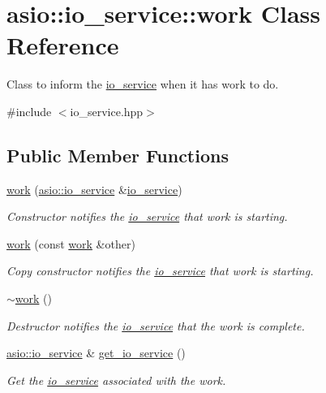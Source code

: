 \hypertarget{classasio_1_1io__service_1_1work}{}\section{asio\+:\+:io\+\_\+service\+:\+:work Class Reference}
\label{classasio_1_1io__service_1_1work}


Class to inform the \hyperlink{classasio_1_1io__service}{io\+\_\+service} when it has work to do.  




{\ttfamily \#include $<$io\+\_\+service.\+hpp$>$}

\subsection*{Public Member Functions}
\begin{DoxyCompactItemize}
\item 
\hyperlink{classasio_1_1io__service_1_1work_a6f49aeea63cbba270f16f71229958b6b}{work} (\hyperlink{classasio_1_1io__service}{asio\+::io\+\_\+service} \&\hyperlink{classasio_1_1io__service}{io\+\_\+service})
\begin{DoxyCompactList}\small\item\em Constructor notifies the \hyperlink{classasio_1_1io__service}{io\+\_\+service} that work is starting. \end{DoxyCompactList}\item 
\hyperlink{classasio_1_1io__service_1_1work_aa2e88368613626e0bbfa8df0fa002bb2}{work} (const \hyperlink{classasio_1_1io__service_1_1work}{work} \&other)
\begin{DoxyCompactList}\small\item\em Copy constructor notifies the \hyperlink{classasio_1_1io__service}{io\+\_\+service} that work is starting. \end{DoxyCompactList}\item 
\hyperlink{classasio_1_1io__service_1_1work_aa2f10ca46883519c66c50973ffabbe49}{$\sim$work} ()
\begin{DoxyCompactList}\small\item\em Destructor notifies the \hyperlink{classasio_1_1io__service}{io\+\_\+service} that the work is complete. \end{DoxyCompactList}\item 
\hyperlink{classasio_1_1io__service}{asio\+::io\+\_\+service} \& \hyperlink{classasio_1_1io__service_1_1work_a2f8c17cdaa95e5bf43002d37b1d6eb90}{get\+\_\+io\+\_\+service} ()
\begin{DoxyCompactList}\small\item\em Get the \hyperlink{classasio_1_1io__service}{io\+\_\+service} associated with the work. \end{DoxyCompactList}\end{DoxyCompactItemize}


